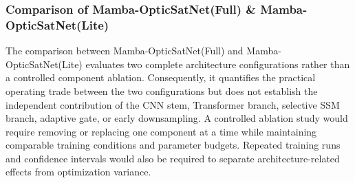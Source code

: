 \documentclass[a4paper,fleqn]{cas-dc}
\begin{document}
\subsubsection{Comparison of Mamba-OpticSatNet(Full) \& Mamba-OpticSatNet(Lite)}
The comparison between Mamba-OpticSatNet(Full) and Mamba-OpticSatNet(Lite) evaluates two complete architecture configurations rather than a controlled component ablation. Consequently, it quantifies the practical operating trade between the two configurations but does not establish the independent contribution of the CNN stem, Transformer branch, selective SSM branch, adaptive gate, or early downsampling. A controlled ablation study would require removing or replacing one component at a time while maintaining comparable training conditions and parameter budgets. Repeated training runs and confidence intervals would also be required to separate architecture-related effects from optimization variance.
\end{document}
